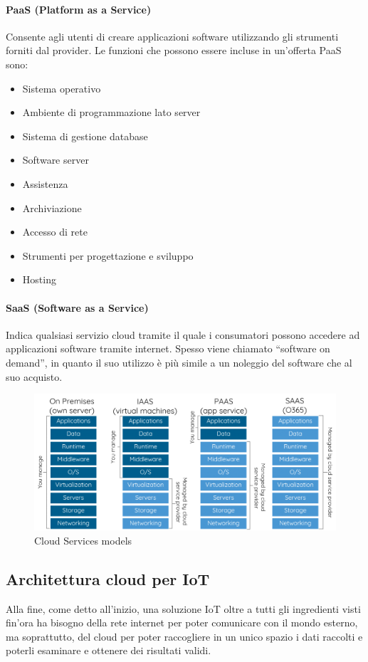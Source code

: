 \documentclass[10pt,a4paper,oneside]{scrbook}
\begin{document}
\paragraph{PaaS (Platform as a Service)}
Consente agli utenti di creare applicazioni software utilizzando gli strumenti forniti dal provider.
Le funzioni che possono essere incluse in un'offerta PaaS sono:
\begin{itemize}
    \item Sistema operativo
    \item Ambiente di programmazione lato server
    \item Sistema di gestione database
    \item Software server
    \item Assistenza
    \item Archiviazione
    \item Accesso di rete
    \item Strumenti per progettazione e sviluppo 
    \item Hosting
\end{itemize}

\paragraph{SaaS (Software as a Service)}
Indica qualsiasi servizio cloud tramite il quale i consumatori possono accedere ad applicazioni software tramite internet.
Spesso viene chiamato ``software on demand'', in quanto il suo utilizzo è più simile a un noleggio del software che al suo acquisto.
\begin{figure}[h]
    \centering
    \includegraphics[width=1\linewidth]{img/Cloud-service.png}
    \caption{Cloud Services models}
    \label{fig:Cloud Services models}
\end{figure}

\subsection{Architettura cloud per IoT}
Alla fine, come detto all'inizio, una soluzione IoT oltre a tutti gli ingredienti visti fin'ora ha bisogno della rete internet per poter comunicare
con il mondo esterno, ma soprattutto, del cloud per poter raccogliere in un unico spazio i dati raccolti e poterli esaminare e ottenere dei risultati validi.
\end{document}
